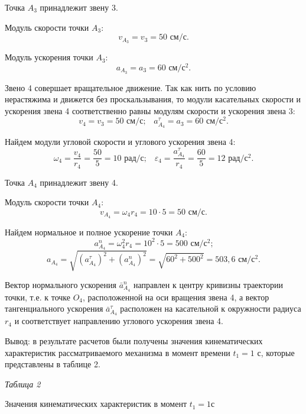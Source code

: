 \documentclass{article}
\begin{document}
Точка $A_3$ принадлежит звену 3.

Модуль скорости точки $A_3$:
$$v_{A_3}=v_3 = 50\text{ см/с.}$$

Модуль ускорения точки $A_3$:
$$a_{A_3}=a_3 = 60\text{ см/с$^2$.}$$

Звено 4 совершает вращательное движение. Так как нить по условию нерастяжима и движется без проскальзывания, то модули касательных скорости и ускорения звена 4 соответственно равны модулям скорости и ускорения звена 3:
$$v_4 = v_3 = 50 \text{ см/с;} \quad a_{A_4}^\tau = a_3 = 60 \text{ см/с$^2$.}$$

Найдем модули угловой скорости и углового ускорения звена 4:
$$ \omega_4 = \frac{v_4}{r_4} = \frac{50}{5} = 10 \text{ рад/с;} \quad \varepsilon_4 = \frac{a_{A_4}^\tau}{r_4} = \frac{60}{5} = 12 \text{ рад/с$^2$.} $$

Точка $A_4$ принадлежит звену 4.

Модуль скорости точки $A_4$:
$$v_{A_4}= \omega_4 r_4 = 10 \cdot 5 = 50 \text{ см/с.}$$

Найдем нормальное и полное ускорение точки $A_4$:
$$ a_{A_4}^n = \omega_4^2 r_4 = 10^2 \cdot 5 = 500 \text{ см/с$^2$;}$$
$$ a_{A_4} = \sqrt{(a_{A_4}^\tau)^2 + (a_{A_4}^n)^2} = \sqrt{60^2 + 500^2} = 503,6 \text{ см/с$^2$.} $$

\newpage

Вектор нормального ускорения $\bar{a}_{A_4}^n$ направлен к центру кривизны траектории точки, т.е. к точке $O_4$, расположенной на оси вращения звена 4, а вектор тангенциального ускорения $\bar{a}_{A_4}^\tau$ расположен на касательной к окружности радиуса $r_4$ и соответствует направлению  углового ускорения звена 4.

Вывод: в результате расчетов были получены значения кинематических характеристик рассматриваемого
механизма в момент времени $t_1=1$ с, которые представлены в таблице 2.

\begin{flushright}
  \small\textit{Таблица 2} \hspace*{0.4cm}
\end{flushright}

\vspace*{-0.9cm}

\begin{center}
  Значения кинематических характеристик в момент $t_1=1$с
\end{center}
\end{document}
